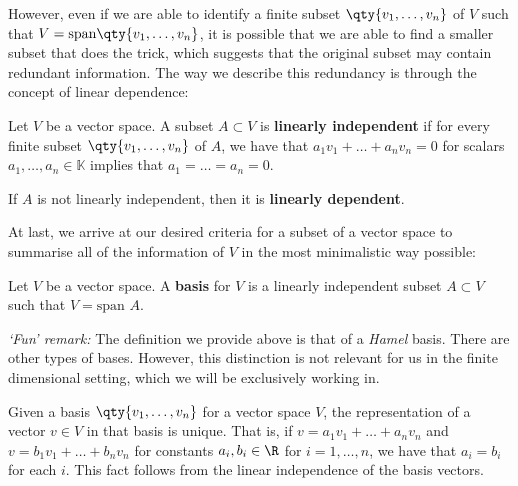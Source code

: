 \vspace{3mm}

However, even if we are able to identify a finite subset \( \qty{v_1,\dots,v_n} \) of \( V \) such that \( V=\text{span}\qty{v_1,\dots,v_n} \), it is possible that we are able to find a smaller subset that does the trick, which suggests that the original subset may contain redundant information. The way we describe this redundancy is through the concept of linear dependence:

\begin{definition}
  Let \( V \) be a vector space. A subset \( A\subset V \) is \textbf{linearly independent} if for every finite subset \( \qty{v_1,\dots, v_n} \) of \( A \), we have that \(a_1v_1+\dots +a_nv_n=0  \) for scalars \( a_1,\dots, a_n\in\mathbb{K} \) implies that \( a_1=\dots =a_n=0 \).

  \vspace{3mm}

  If \( A \) is not linearly independent, then it is \textbf{linearly dependent}.
\end{definition}

At last, we arrive at our desired criteria for a subset of a vector space to summarise all of the information of \( V \) in the most minimalistic way possible:

\begin{definition}
  Let \( V \) be a vector space. A \textbf{basis} for \( V \) is a linearly independent subset \( A\subset V \) such that \( V=\text{span }A \).
\end{definition}

\emph{`Fun' remark:} The definition we provide above is that of a \emph{Hamel} basis. There are other types of bases. However, this distinction is not relevant for us in the finite dimensional setting, which we will be exclusively working in.

\vspace{3mm}

Given a basis \( \qty{v_1,\dots,v_n} \) for a vector space \( V \), the representation of a vector \( v\in V \) in that basis is unique. That is, if \( v=a_1v_1+\dots+a_nv_n \) and \( v=b_1v_1+\dots+b_nv_n \) for constants \( a_i,b_i\in\R \) for \( i=1,\dots, n \), we have that \( a_i=b_i \) for each \( i \). This fact follows from the linear independence of the basis vectors.

\vspace{3mm}

